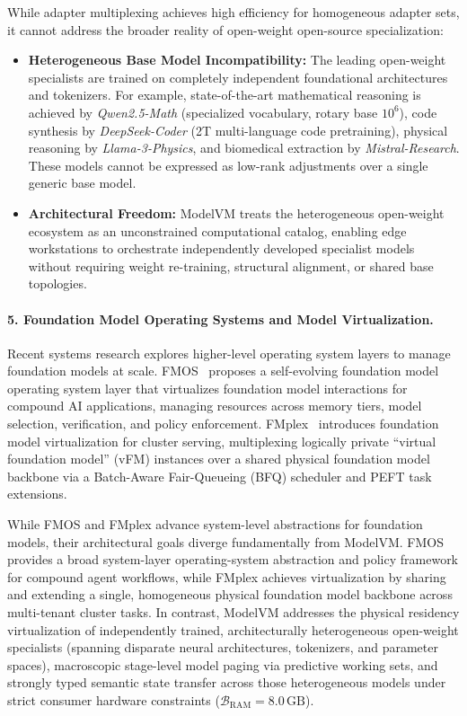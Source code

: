 While adapter multiplexing achieves high efficiency for homogeneous adapter sets, it cannot address the broader reality of open-weight open-source specialization:
\begin{itemize}
    \item \textbf{Heterogeneous Base Model Incompatibility:} The leading open-weight specialists are trained on completely independent foundational architectures and tokenizers. For example, state-of-the-art mathematical reasoning is achieved by \textit{Qwen2.5-Math} (specialized vocabulary, rotary base $10^6$), code synthesis by \textit{DeepSeek-Coder} (2T multi-language code pretraining), physical reasoning by \textit{Llama-3-Physics}, and biomedical extraction by \textit{Mistral-Research}. These models cannot be expressed as low-rank adjustments over a single generic base model.
    \item \textbf{Architectural Freedom:} ModelVM treats the heterogeneous open-weight ecosystem as an unconstrained computational catalog, enabling edge workstations to orchestrate independently developed specialist models without requiring weight re-training, structural alignment, or shared base topologies.
\end{itemize}

\paragraph{5. Foundation Model Operating Systems and Model Virtualization.}
Recent systems research explores higher-level operating system layers to manage foundation models at scale. FMOS~\cite{bhattacharya2026fmos} proposes a self-evolving foundation model operating system layer that virtualizes foundation model interactions for compound AI applications, managing resources across memory tiers, model selection, verification, and policy enforcement. FMplex~\cite{shastri2026fmplex} introduces foundation model virtualization for cluster serving, multiplexing logically private ``virtual foundation model'' (vFM) instances over a shared physical foundation model backbone via a Batch-Aware Fair-Queueing (BFQ) scheduler and PEFT task extensions.

While FMOS and FMplex advance system-level abstractions for foundation models, their architectural goals diverge fundamentally from ModelVM. FMOS provides a broad system-layer operating-system abstraction and policy framework for compound agent workflows, while FMplex achieves virtualization by sharing and extending a single, homogeneous physical foundation model backbone across multi-tenant cluster tasks. In contrast, ModelVM addresses the physical residency virtualization of independently trained, architecturally heterogeneous open-weight specialists (spanning disparate neural architectures, tokenizers, and parameter spaces), macroscopic stage-level model paging via predictive working sets, and strongly typed semantic state transfer across those heterogeneous models under strict consumer hardware constraints ($\mathcal{B}_{\text{RAM}} = 8.0\,\text{GB}$).

